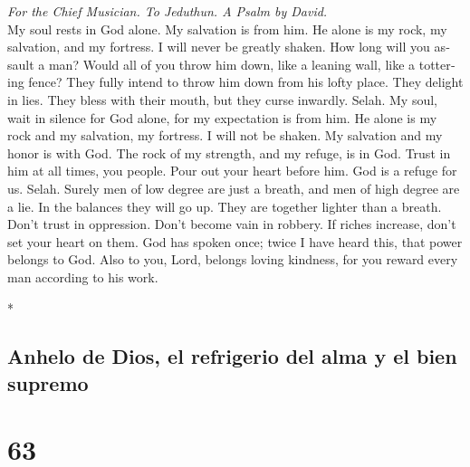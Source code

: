 \begin{paracol}{2}
\begin{otherlanguage}{english}
\emph{For the Chief Musician. To Jeduthun. A Psalm by David.}\\
 My soul rests in God alone. My salvation is from him.
 He alone is my rock, my salvation, and my fortress. I
will never be greatly shaken.  How long will you assault a
man? Would all of you throw him down, like a leaning wall, like a
tottering fence?  They fully intend to throw him down from
his lofty place. They delight in lies. They bless with their mouth, but
they curse inwardly. Selah.  My soul, wait in silence for
God alone, for my expectation is from him.  He alone is my
rock and my salvation, my fortress. I will not be shaken. 
My salvation and my honor is with God. The rock of my strength, and my
refuge, is in God.  Trust in him at all times, you people.
Pour out your heart before him. God is a refuge for us. Selah.
 Surely men of low degree are just a breath, and men of
high degree are a lie. In the balances they will go up. They are
together lighter than a breath.  Don't trust in
oppression. Don't become vain in robbery. If riches increase, don't set
your heart on them.  God has spoken once; twice I have
heard this, that power belongs to God.  Also to you,
Lord, belongs loving kindness, for you reward every man according to his
work.

\end{otherlanguage}

\switchcolumn[0]*

\hypertarget{anhelo-de-dios-el-refrigerio-del-alma-y-el-bien-supremo}{%
\subsection{Anhelo de Dios, el refrigerio del alma y el bien
supremo}\label{anhelo-de-dios-el-refrigerio-del-alma-y-el-bien-supremo}}

\hypertarget{section-124}{%
\section{63}\label{section-124}}


\end{paracol}
